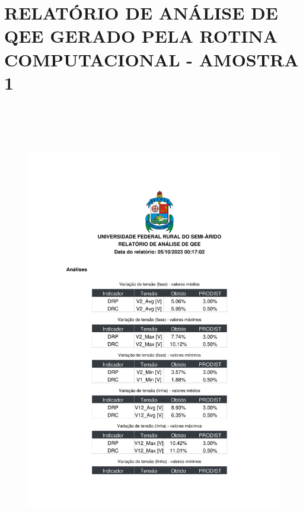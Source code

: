 \chapter{RELATÓRIO DE ANÁLISE DE QEE GERADO PELA ROTINA COMPUTACIONAL - AMOSTRA 1}
\label{ap:analise_a1}

\begin{figure}[H]
	\centering
  \includegraphics[height=20cm, page=1, clip]{contents/post_textual/analise_amostra_1.pdf}
\end{figure}

